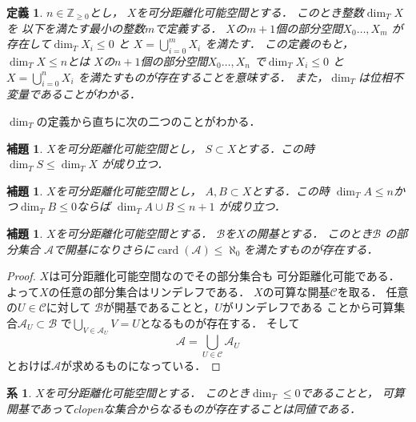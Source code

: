 \documentclass[leqno, a4paper, 12pt]{jsarticle}
\newtheorem{cor}[thm]{系}
\newtheorem{lem}[thm]{補題}
\newtheorem{df}[thm]{定義}
\newcommand{\zz}{\mathbb{Z}}
\DeclareMathOperator{\card}{card}
\begin{document}
\begin{df}
$n\in \zz_{\ge 0}$とし，
$X$を可分距離化可能空間とする．
このとき整数$\dim_{T}X$を
以下を満たす最小の整数$m$で定義する．
$X$の$m+1$個の部分空間$X_{0}\dots, X_{m}$
が存在して$\dim_{T}X_{i}\le 0$
と
$X=\bigcup_{i=0}^{m}X_{i}$
を満たす．
この定義のもと，$\dim_{T}X\le n$とは
$X$の$n+1$個の部分空間$X_{0}\dots, X_{n}$
で$\dim_{T}X_{i}\le 0$
と
$X=\bigcup_{i=0}^{n}X_{i}$
を満たすものが存在することを意味する．
また，$\dim_{T}$は位相不変量であることがわかる．
\end{df}

$\dim_{T}$の定義から直ちに次の二つのことがわかる．
\begin{lem}
$X$を可分距離化可能空間とし，
$S\subset X$とする．この時
$\dim_{T}S\le \dim_{T}X$
が成り立つ．
\end{lem}

\begin{lem}\label{lem:plpl}
$X$を可分距離化可能空間とし，
$A, B\subset X$とする．この時
$\dim_{T}A\le n$かつ$\dim_{T}B\le 0$ならば
$\dim_{T}A\cup B\le n+1$
が成り立つ．
\end{lem}



\begin{lem}\label{lem:toridashi}
$X$を可分距離化可能空間とする．
$\mathcal{B}$を$X$の開基とする．
このとき$\mathcal{B}$
の部分集合
$\mathcal{A}$で開基になりさらに$\card(\mathcal{A})\le \aleph_{0}$を満たすものが存在する．
\end{lem}
\begin{proof}
$X$は可分距離化可能空間なのでその部分集合も
可分距離化可能である．
よって$X$の任意の部分集合はリンデレフである．
$X$の可算な開基$\mathcal{C}$を取る．
任意の$U\in \mathcal{C}$に対して
$\mathcal{B}$が開基であることと，$U$がリンデレフである
ことから可算集合$\mathcal{A}_{U}\subset \mathcal{B}$
で$\bigcup_{V\in  \mathcal{A}_{U}}V=U$となるものが存在する．
そして
\[
\mathcal{A}=\bigcup_{U\in \mathcal{C}}\mathcal{A}_{U}
\]
とおけば$\mathcal{A}$が求めるものになっている．
\end{proof}


\begin{cor}
$X$を可分距離化可能空間とする．
このとき$\dim_{T}\le 0$であることと，
可算開基であってclopenな集合からなるものが存在することは同値である．
\end{cor}
\end{document}
